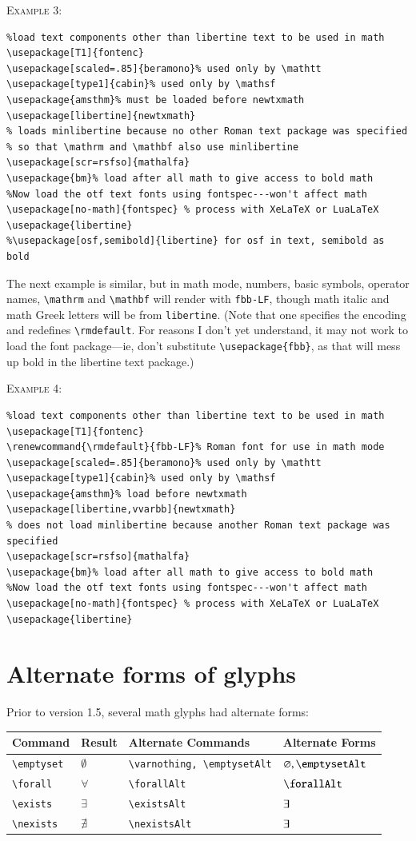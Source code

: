 \documentclass[11pt]{article}
\theoremstyle{oldplain}
\theoremstyle{plain}
\begin{document}
\textsc{Example 3:}
\begin{verbatim}
%load text components other than libertine text to be used in math
\usepackage[T1]{fontenc}
\usepackage[scaled=.85]{beramono}% used only by \mathtt
\usepackage[type1]{cabin}% used only by \mathsf
\usepackage{amsthm}% must be loaded before newtxmath
\usepackage[libertine]{newtxmath}
% loads minlibertine because no other Roman text package was specified
% so that \mathrm and \mathbf also use minlibertine
\usepackage[scr=rsfso]{mathalfa}
\usepackage{bm}% load after all math to give access to bold math
%Now load the otf text fonts using fontspec---won't affect math
\usepackage[no-math]{fontspec} % process with XeLaTeX or LuaLaTeX
\usepackage{libertine}
%\usepackage[osf,semibold]{libertine} for osf in text, semibold as bold
\end{verbatim}
The next example is similar, but in math mode, numbers, basic symbols, operator names, \verb|\mathrm| and \verb|\mathbf| will render with {\tt fbb-LF}, though  math italic and math Greek letters will be from {\tt libertine}. (Note that one specifies the encoding and redefines \verb|\rmdefault|. For reasons I don't yet understand, it may not work to load the font package---ie, don't substitute \verb|\usepackage{fbb}|, as that will mess up bold in the libertine text package.) 

\textsc{Example 4:}
\begin{verbatim}
%load text components other than libertine text to be used in math
\usepackage[T1]{fontenc}
\renewcommand{\rmdefault}{fbb-LF}% Roman font for use in math mode
\usepackage[scaled=.85]{beramono}% used only by \mathtt
\usepackage[type1]{cabin}% used only by \mathsf
\usepackage{amsthm}% load before newtxmath
\usepackage[libertine,vvarbb]{newtxmath}
% does not load minlibertine because another Roman text package was specified
\usepackage[scr=rsfso]{mathalfa}
\usepackage{bm}% load after all math to give access to bold math
%Now load the otf text fonts using fontspec---won't affect math
\usepackage[no-math]{fontspec} % process with XeLaTeX or LuaLaTeX
\usepackage{libertine}
\end{verbatim}


\section{Alternate forms of glyphs}
Prior to version 1.5, several math glyphs had alternate forms:
\begin{center}
  \begin{tabular}{@{} llll @{}}
    \hline
    Command & Result &  Alternate Commands & Alternate Forms\\ 
    \hline
    \verb|\emptyset| & $\emptyset$ & \verb|\varnothing, \emptysetAlt|& $\varnothing, \emptysetAlt$ \\ 
    \verb|\forall| & $\forall$ & \verb|\forallAlt| & $\forallAlt$ \\ 
    \verb|\exists| & $\exists$ & \verb|\existsAlt| & $\exists$ \\ 
    \verb|\nexists| & $\nexists$ & \verb|\nexistsAlt| & $\exists$ \\ 
    \hline
  \end{tabular}
\end{center}
\end{document}
